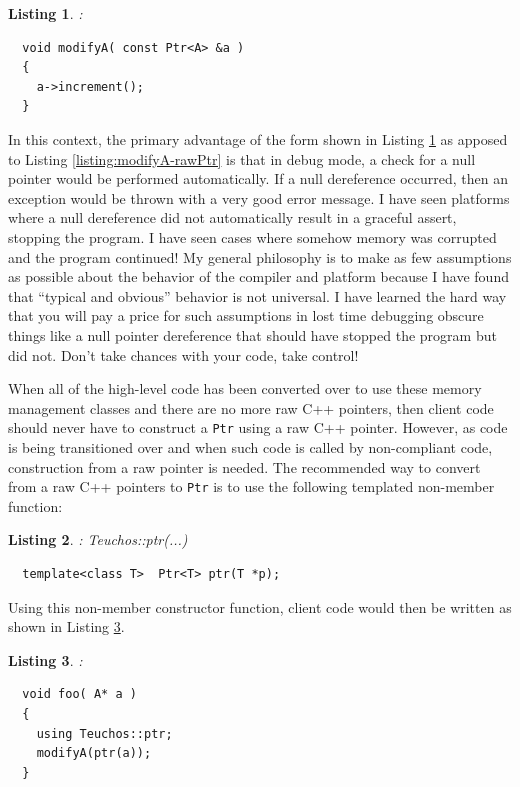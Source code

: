 \documentclass[pdf,ps2pdf,11pt]{SANDreport}
\newtheorem{listing}{Listing}
\begin{document}
\begin{listing}:\\
\label{listing:modifyA-Ptr}
{\small\begin{verbatim}
  void modifyA( const Ptr<A> &a )
  {
    a->increment();
  }
\end{verbatim}}
\end{listing}

In this context, the primary advantage of the form shown in Listing
{}\ref{listing:modifyA-Ptr} as apposed to Listing
{}\ref{listing:modifyA-rawPtr} is that in debug mode, a check for a
null pointer would be performed automatically.  If a null dereference
occurred, then an exception would be thrown with a very good error
message. I have seen platforms where a null dereference did not
automatically result in a graceful assert, stopping the program.  I
have seen cases where somehow memory was corrupted and the program
continued!  My general philosophy is to make as few assumptions as
possible about the behavior of the compiler and platform because I
have found that ``typical and obvious'' behavior is not universal.  I
have learned the hard way that you will pay a price for such
assumptions in lost time debugging obscure things like a null pointer
dereference that should have stopped the program but did not.  Don't
take chances with your code, take control!

When all of the high-level code has been converted over to use these
memory management classes and there are no more raw C++ pointers, then
client code should never have to construct a {}\texttt{Ptr} using a
raw C++ pointer.  However, as code is being transitioned over and
when such code is called by non-compliant code, construction from a
raw pointer is needed.  The recommended way to convert from a raw C++
pointers to {}\texttt{Ptr} is to use the following templated
non-member function:

\begin{listing}: Teuchos::ptr(...)\\
\label{listing:ptr}
{\small\begin{verbatim}
  template<class T>  Ptr<T> ptr(T *p);
\end{verbatim}}
\end{listing}

Using this non-member constructor function, client code would then be
written as shown in Listing {}\ref{listing:using-ptr}.

\begin{listing}:\\
\label{listing:using-ptr}
{\small\begin{verbatim}
  void foo( A* a )
  {
    using Teuchos::ptr;
    modifyA(ptr(a));
  }
\end{verbatim}}
\end{listing}
\end{document}
